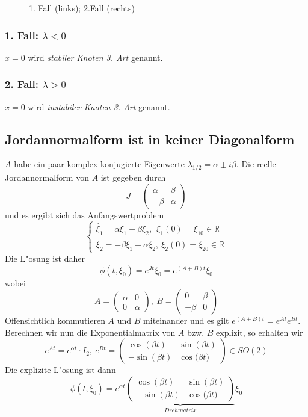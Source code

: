 \documentclass[a4paper, 13pt]{scrreprt}
\theoremstyle{definition} \newtheorem{definition}{Definition}[section]
\newcommand{\RR}{\mathbb{R}}
\begin{document}
\begin{figure}[htpb]
		\caption{1. Fall (links); 2.Fall (rechts)}
	\end{figure}
\subsubsection{1. Fall: $\lambda < 0$} 
$x = 0$ wird \emph{stabiler Knoten 3. Art} genannt.
\subsubsection{2. Fall: $\lambda > 0$}
$ x = 0 $ wird \emph{instabiler Knoten 3. Art} genannt.

\subsection{Jordannormalform ist in keiner Diagonalform} 
$A$ habe ein paar komplex konjugierte Eigenwerte $\lambda_{1/2} = \alpha \pm i \beta $. Die reelle Jordannormalform von $A$ ist gegeben durch
				$$ J = \left( \begin{array}{cc} \alpha & \beta \\ - \beta & \alpha \end{array}\right) $$ 
und es ergibt sich das Anfangswertproblem
		\[\begin{cases} 
			\dot{\xi_1} =  \alpha \xi_1 + \beta\xi_2, \ \  \xi_1(0) = \xi_{10} \in \RR \\
			\dot{\xi_2} = -\beta \xi_1 + \alpha \xi_2 , \ \xi_2(0) = \xi_{20} \in \RR
		\end{cases} \]
Die L"osung ist daher		
		\[ \phi(t,\xi_0) = e^{Jt} \xi_0 = e^{(A+B)t} \xi_0 \]
				wobei 
				$$ A = \left( \begin{array}{cc} \alpha & 0 \\ 0 & \alpha \end{array}\right), \ B = \left( \begin{array}{cc} 0 & \beta \\ - \beta & 0 \end{array}\right) $$
Offensichtlich kommutieren $A$ und $B$ miteinander und es gilt $ e^{(A+B)t} = e^{At} e^{Bt} $. Berechnen wir nun die Exponentialmatrix von $A$ bzw. $B$ explizit, so erhalten wir
				$$ e^{At} = e^{\alpha t} \cdot I_2, \  e^{Bt} = \left(\begin{array}{cc} \cos{(\beta t)}  & \sin{(\beta t)} \\ - \sin{(\beta t )} & \cos{(\beta t })  \end{array}\right) \in SO(2) $$
Die explizite L"osung ist dann
				\[\phi(t, \xi_0) = e^{\alpha t} \underbrace{\left(\begin{array}{cc} \cos{(\beta t)}  & \sin{(\beta t)} \\ - \sin{(\beta t )} & \cos{(\beta t })  \end{array}\right)}_{Drehmatrix} \xi_0
				\]
				
\end{document}

